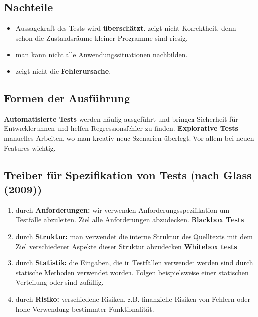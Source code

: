 \documentclass{book}
\begin{document}
    \subsection{Nachteile}
    \begin{itemize}
        \item Aussagekraft des Tests wird \textbf{überschätzt}. zeigt nicht Korrektheit, denn schon die Zustandsräume kleiner Programme sind riesig.
        \item man kann nicht alle Anwendungssituationen nachbilden.
        \item zeigt nicht die \textbf{Fehlerursache}.
    \end{itemize}
    \subsection{Formen der Ausführung}
    \textbf{Automatisierte Tests} werden häufig ausgeführt und bringen Sicherheit für Entwickler:innen und helfen Regressionsfehler zu finden. \newline
    \textbf{Explorative Tests} manuelles Arbeiten, wo man kreativ neue Szenarien überlegt. Vor allem bei neuen Features wichtig.
    \subsection{Treiber für Spezifikation von Tests (nach Glass (2009))}
    \begin{enumerate}
        \item durch \textbf{Anforderungen:} wir verwenden Anforderungsspezifikation um Testfälle abzuleiten. Ziel alle Anforderungen abzudecken. \textbf{Blackbox Tests}
        \item durch \textbf{Struktur:} man verwendet die interne Struktur des Quelltexts mit dem Ziel verschiedener Aspekte dieser Struktur abzudecken \textbf{Whitebox tests}
        \item durch \textbf{Statistik:} die Eingaben, die in Testfällen verwendet werden sind durch statische Methoden verwendet worden. Folgen beispielsweise einer statischen Verteilung oder sind zufällig.
        \item durch \textbf{Risiko:} verschiedene Risiken, z.B. finanzielle Risiken von Fehlern oder hohe Verwendung bestimmter Funktionalität.
    \end{enumerate}
\end{document}
